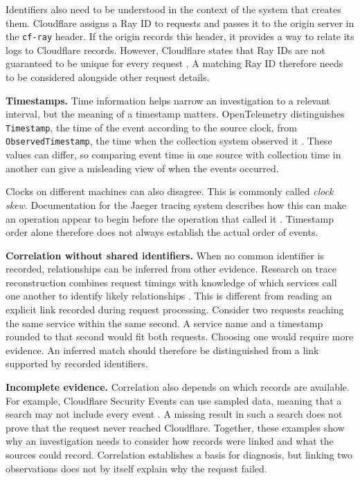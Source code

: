 Identifiers also need to be understood in the context of the system that
creates them. Cloudflare assigns a Ray ID to requests and passes it to the
origin server in the \texttt{cf-ray} header. If the origin records this
header, it provides a way to relate its logs to Cloudflare records.
However, Cloudflare states that Ray IDs are not guaranteed to be unique
for every request \parencite{cloudflare2026rayid}. A matching Ray ID
therefore needs to be considered alongside other request details.

\noindent\textbf{Timestamps.} Time information helps narrow an investigation
to a relevant interval, but the meaning of a timestamp matters.
OpenTelemetry distinguishes \texttt{Timestamp}, the time of the event
according to the source clock, from \texttt{ObservedTimestamp}, the time
when the collection system observed it
\parencite{opentelemetry2026logsmodel}. These values can differ, so comparing
event time in one source with collection time in another can give a
misleading view of when the events occurred.

Clocks on different machines can also disagree. This is commonly called
\emph{clock skew}. Documentation for the Jaeger tracing system describes how this can
make an operation appear to begin before the operation that called it
\parencite{jaeger2025clockskew}. Timestamp order alone therefore does not
always establish the actual order of events.

\noindent\textbf{Correlation without shared identifiers.} When no common
identifier is recorded, relationships can be inferred from other evidence.
Research on trace reconstruction combines request timings with knowledge
of which services call one another to identify likely relationships
\parencite{ashok2024traceweaver}. This is different from reading an explicit
link recorded during request processing. Consider two requests reaching the
same service within the same second. A service name and a timestamp rounded
to that second would fit both requests. Choosing one would require more
evidence. An inferred match should therefore be distinguished from a link
supported by recorded identifiers.

\noindent\textbf{Incomplete evidence.} Correlation also depends on which
records are available. For example, Cloudflare Security Events can use
sampled data, meaning that a search may not include every event
\parencite{cloudflare2026rayid}. A missing result in such a search does not
prove that the request never reached Cloudflare. Together, these examples
show why an investigation needs to consider how records were linked and
what the sources could record. Correlation establishes a basis for
diagnosis, but linking two observations does not by itself explain why
the request failed.


